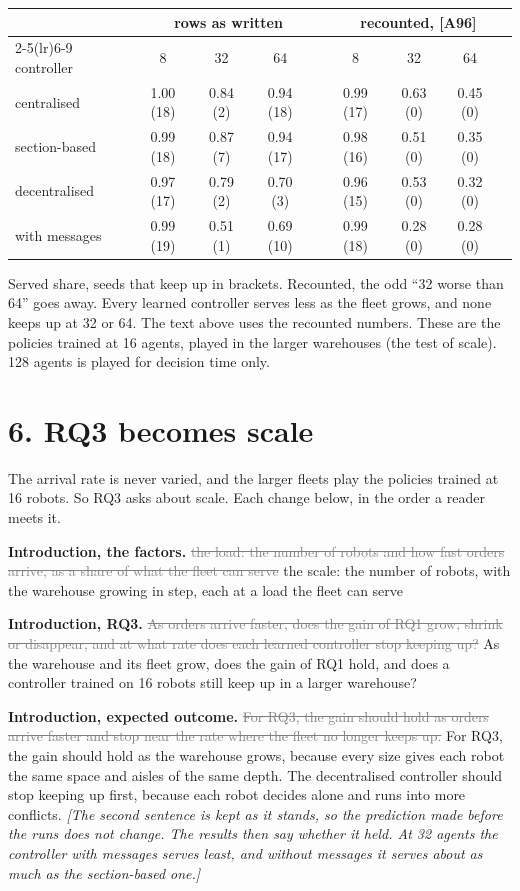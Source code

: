 \documentclass[11pt,a4paper]{article}
\newcommand{\new}[1]{\textcolor{newc}{#1}}
\newcommand{\old}[1]{\textcolor{gray}{\sout{#1}}}
\newcommand{\note}[1]{{\small\itshape [#1]}}
\begin{document}
\begin{tabular}{lcccc cccc}
  \toprule
  & \multicolumn{4}{c}{rows as written} & \multicolumn{4}{c}{recounted, [A96]} \\
  \cmidrule(lr){2-5}\cmidrule(lr){6-9}
  controller & 8 & 32 & 64 & & 8 & 32 & 64 & \\
  \midrule
  centralised    & 1.00 (18) & 0.84 (2) & 0.94 (18) && 0.99 (17) & 0.63 (0) & 0.45 (0) \\
  section-based  & 0.99 (18) & 0.87 (7) & 0.94 (17) && 0.98 (16) & 0.51 (0) & 0.35 (0) \\
  decentralised  & 0.97 (17) & 0.79 (2) & 0.70 (3)  && 0.96 (15) & 0.53 (0) & 0.32 (0) \\
  with messages  & 0.99 (19) & 0.51 (1) & 0.69 (10) && 0.99 (18) & 0.28 (0) & 0.28 (0) \\
  \bottomrule
\end{tabular}

Served share, seeds that keep up in brackets. Recounted, the odd ``32 worse
than 64'' goes away. Every learned controller serves less as the fleet grows,
and none keeps up at 32 or 64. The text above uses the recounted numbers.
These are the policies trained at 16 agents, played in the larger warehouses
(the test of scale). 128 agents is played for decision time only.

\section*{6. RQ3 becomes scale}
The arrival rate is never varied, and the larger fleets play the policies
trained at 16 robots. So RQ3 asks about scale. Each change below, in the
order a reader meets it.

\textbf{Introduction, the factors.}
\old{the load: the number of robots and how fast orders arrive, as a share of
what the fleet can serve}
\new{the scale: the number of robots, with the warehouse growing in step,
each at a load the fleet can serve}

\textbf{Introduction, RQ3.}
\old{As orders arrive faster, does the gain of RQ1 grow, shrink or disappear,
and at what rate does each learned controller stop keeping up?}
\new{As the warehouse and its fleet grow, does the gain of RQ1 hold, and does
a controller trained on 16 robots still keep up in a larger warehouse?}

\textbf{Introduction, expected outcome.}
\old{For RQ3, the gain should hold as orders arrive faster and stop near the
rate where the fleet no longer keeps up.}
\new{For RQ3, the gain should hold as the warehouse grows, because every
size gives each robot the same space and aisles of the same depth.}
The decentralised controller should stop keeping up first, because each
robot decides alone and runs into more conflicts.
\note{The second sentence is kept as it stands, so the prediction made before
the runs does not change. The results then say whether it held. At 32
agents the controller with messages serves least, and without messages it
serves about as much as the section-based one.}
\end{document}
